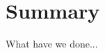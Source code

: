 \documentclass[12pt]{article}
\begin{document}
\newpage
\section{ Summary }

What have we done...


% 
% 
% 


\end{document}
